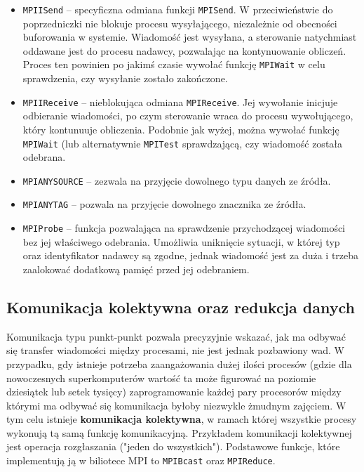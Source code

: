\begin{itemize}
	\item \texttt{MPI\textunderscore ISend} -- specyficzna odmiana funkcji \texttt{MPI\textunderscore Send}. W przeciwieństwie do poprzedniczki nie blokuje procesu wysyłającego, niezależnie od obecności buforowania w systemie. Wiadomość jest wysyłana, a sterowanie natychmiast oddawane jest do procesu nadawcy, pozwalając na kontynuowanie obliczeń. Proces ten powinien po jakimś czasie wywołać funkcję \texttt{MPI\textunderscore Wait} w celu sprawdzenia, czy wysyłanie zostało zakończone.
	\item \texttt{MPI\textunderscore IReceive} -- nieblokująca odmiana
	\texttt{MPI\textunderscore Receive}. Jej wywołanie inicjuje odbieranie wiadomości, po czym sterowanie wraca do procesu wywołującego, który kontunuuje obliczenia. Podobnie jak wyżej, można wywołać funkcję \texttt{MPI\textunderscore Wait} (lub alternatywnie \texttt{MPI\textunderscore Test} sprawdzającą, czy wiadomość została odebrana.
	\item \texttt{MPI\textunderscore ANY\textunderscore SOURCE} -- zezwala na przyjęcie dowolnego typu danych ze źródła.
	\item \texttt{MPI\textunderscore ANY\textunderscore TAG} -- pozwala na przyjęcie dowolnego znacznika ze źródła.
	\item \texttt{MPI\textunderscore Probe} -- funkcja pozwalająca na sprawdzenie przychodzącej wiadomości bez jej właściwego odebrania. Umożliwia uniknięcie sytuacji, w której typ oraz identyfikator nadawcy są zgodne, jednak wiadomość jest za duża i trzeba zaalokować dodatkową pamięć przed jej odebraniem.
	
\end{itemize}

\subsection{Komunikacja kolektywna oraz redukcja danych}

Komunikacja typu punkt-punkt pozwala precyzyjnie wskazać, jak ma odbywać się transfer wiadomości między procesami, nie jest jednak pozbawiony wad. W przypadku, gdy istnieje potrzeba zaangażowania dużej ilości procesów (gdzie dla nowoczesnych superkomputerów wartość ta może figurować na poziomie dziesiątek lub setek tysięcy) zaprogramowanie każdej pary procesorów między którymi ma odbywać się komunikacja byłoby niezwykle żmudnym zajęciem. W tym celu istnieje \textbf{komunikacja kolektywna}, w ramach której wszystkie procesy wykonują tą samą funkcję komunikacyjną. Przykładem komunikacji kolektywnej jest operacja rozgłaszania ("jeden do wszystkich"). Podstawowe funkcje, które implementują ją w biliotece MPI to \texttt{MPI\textunderscore Bcast} oraz \texttt{MPI\textunderscore Reduce}.

